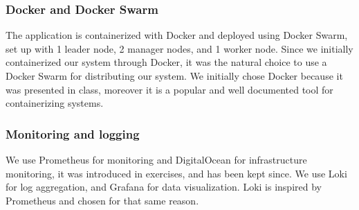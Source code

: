 \subsubsection{Docker and Docker Swarm}

The application is containerized with Docker and deployed using Docker Swarm, set up with 1 leader node, 2 manager nodes, and 1 worker node. 
Since we initially containerized our system through Docker, it was the natural choice to use a Docker Swarm for distributing our system. We initially chose Docker because it was presented in class, moreover it is a popular and well documented tool for containerizing systems.

\subsubsection{Monitoring and logging}
We use Prometheus for monitoring and DigitalOcean for infrastructure monitoring, it was introduced in exercises, and has been kept since. We use Loki for log aggregation, and Grafana for data visualization. Loki is inspired by Prometheus and chosen for that same reason\cite{Loki}.


